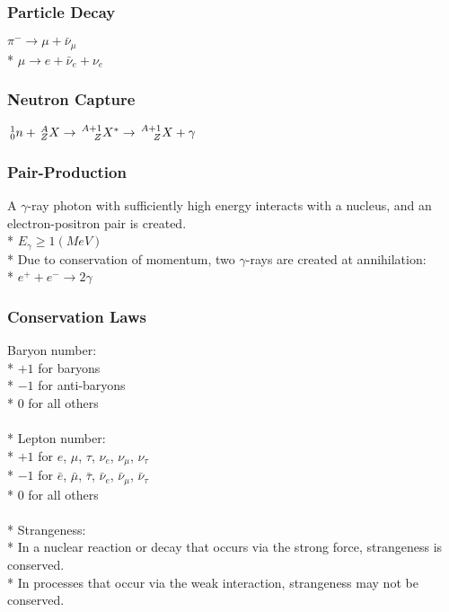 \subsubsection{Particle Decay}
\(\pi^-\rightarrow\mu+\bar{\nu}_{\mu}\)\\*
\(\mu\rightarrow e+\bar{\nu}_e+\nu_e\)

\subsubsection{Neutron Capture}
\(\,^1_0n+\,^A_ZX\rightarrow\,^{A+1}_{\hspace{.35cm}Z}X^*\rightarrow\,^{A+1}_{\hspace{.35cm}Z}X+\gamma\)

\subsubsection{Pair-Production}
A \(\gamma\)-ray photon with sufficiently high energy interacts with a nucleus, and an electron-positron pair is created.\\*
\(E_{\gamma}\ge1(MeV)\)\\*
Due to conservation of momentum, two \(\gamma\)-rays are created at annihilation:\\*
\(e^++e^-\rightarrow2\gamma\)

\subsubsection{Conservation Laws}
Baryon number:\\*
\(+1\) for baryons\\*
\(-1\) for anti-baryons\\*
\(0\) for all others\\\\*
Lepton number:\\*
\(+1\) for  \(e\), \(\mu\), \(\tau\), \(\nu_e\), \(\nu_{\mu}\), \(\nu_{\tau}\)\\*
\(-1\) for  \(\bar{e}\), \(\bar{\mu}\), \(\bar{\tau}\), \(\bar{\nu}_e\), \(\bar{\nu}_{\mu}\), \(\bar{\nu}_{\tau}\)\\*
\(0\) for all others\\\\*
Strangeness:\\*
In a nuclear reaction or decay that occurs via the strong force, strangeness is conserved.\\*
In processes that occur via the weak interaction, strangeness may not be conserved.

